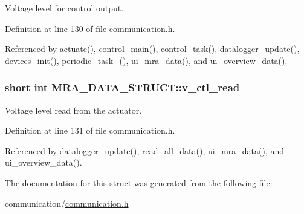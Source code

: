 Voltage level for control output. 



Definition at line 130 of file communication.h.



Referenced by actuate(), control\_\-main(), control\_\-task(), datalogger\_\-update(), devices\_\-init(), periodic\_\-task\_(), ui\_\-mra\_\-data(), and ui\_\-overview\_\-data().

\hypertarget{structMRA__DATA__STRUCT_a3a31d57268c33b21ac915fdc27dfe474}{
\subsubsection[{v\_\-ctl\_\-read}]{\setlength{\rightskip}{0pt plus 5cm}short int {\bf MRA\_\-DATA\_\-STRUCT::v\_\-ctl\_\-read}}}
\label{structMRA__DATA__STRUCT_a3a31d57268c33b21ac915fdc27dfe474}


Voltage level read from the actuator. 



Definition at line 131 of file communication.h.



Referenced by datalogger\_\-update(), read\_\-all\_\-data(), ui\_\-mra\_\-data(), and ui\_\-overview\_\-data().



The documentation for this struct was generated from the following file:\begin{DoxyCompactItemize}
\item 
communication/\hyperlink{communication_8h}{communication.h}\end{DoxyCompactItemize}
